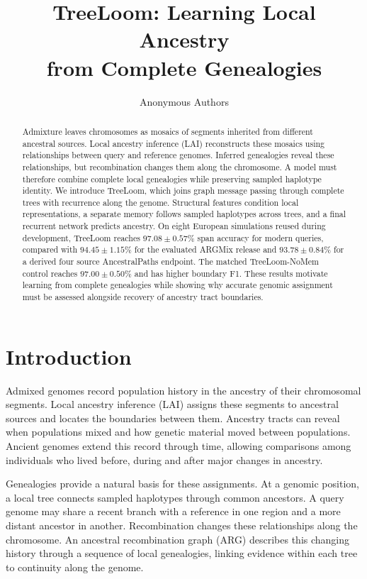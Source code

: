 \documentclass[letterpaper]{article}
\title{TreeLoom: Learning Local Ancestry\\from Complete Genealogies}
\author{Anonymous Authors}
\begin{document}
\maketitle

\begin{abstract}
Admixture leaves chromosomes as mosaics of segments inherited from different ancestral sources. Local ancestry inference (LAI) reconstructs these mosaics using relationships between query and reference genomes. Inferred genealogies reveal these relationships, but recombination changes them along the chromosome. A model must therefore combine complete local genealogies while preserving sampled haplotype identity. We introduce TreeLoom, which joins graph message passing through complete trees with recurrence along the genome. Structural features condition local representations, a separate memory follows sampled haplotypes across trees, and a final recurrent network predicts ancestry. On eight European simulations reused during development, TreeLoom reaches $97.08\pm0.57\%$ span accuracy for modern queries, compared with $94.45\pm1.15\%$ for the evaluated ARGMix release and $93.78\pm0.84\%$ for a derived four source AncestralPaths endpoint. The matched TreeLoom-NoMem control reaches $97.00\pm0.50\%$ and has higher boundary F1. These results motivate learning from complete genealogies while showing why accurate genomic assignment must be assessed alongside recovery of ancestry tract boundaries.
\end{abstract}

\section{Introduction}
Admixed genomes record population history in the ancestry of their chromosomal segments. Local ancestry inference (LAI) assigns these segments to ancestral sources and locates the boundaries between them. Ancestry tracts can reveal when populations mixed and how genetic material moved between populations. Ancient genomes extend this record through time, allowing comparisons among individuals who lived before, during and after major changes in ancestry.

Genealogies provide a natural basis for these assignments. At a genomic position, a local tree connects sampled haplotypes through common ancestors. A query genome may share a recent branch with a reference in one region and a more distant ancestor in another. Recombination changes these relationships along the chromosome. An ancestral recombination graph (ARG) describes this changing history through a sequence of local genealogies, linking evidence within each tree to continuity along the genome.
\end{document}
